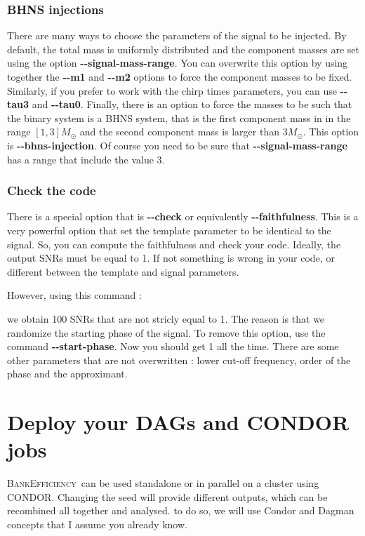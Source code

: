 \documentclass[a4paper,10pt]{article}
\newcommand{\code}[1]{%
\begin{center}
  \fboxsep=10pt
  \fcolorbox{black}{yellow}
  { \parbox[c]{12cm}{ \color{blue}{#1}}}
\end{center}}
\newcommand{\be}{\textsc{BankEfficiency}~}
\begin{document}
 

\subsubsection{BHNS injections}
There are many ways to choose the parameters of the signal to be injected. By default, the total mass is uniformly distributed and the component masses are set using the option \textbf{{-}{-}signal-mass-range}. You can overwrite this option by using together the \textbf{{-}{-}m1} and \textbf{{-}{-}m2} options to force the component masses to be fixed. Similarly, if you prefer to work with the chirp times parameters, you can use 
\textbf{{-}{-}tau3} and \textbf{{-}{-}tau0}. Finally, there is an option to force the masses to be such that the binary system is a BHNS system, that is the first component mass in in the range $[1,3]M_\odot$ and the second component mass is larger than $3M_\odot$. This option is \textbf{{-}{-}bhns-injection}. Of course you need to be sure that \textbf{{-}{-}signal-mass-range} has a range that include the value 3.

\subsubsection{Check the code}
There is a special option that is \textbf{{-}{-}check} or equivalently \textbf{{}-{-}faithfulness}. This is a very powerful option that set the template parameter to be identical to the signal. So, you can compute the faithfulness and check your code. Ideally, the output SNRs must be equal to 1. If not something is wrong in your code, or different between the template and signal parameters. 

However, using this command :
\code{./lalapps\_BankEfficiency --template EOB --signal EOB --xml-output --n 100 --check} 
we obtain 100 SNRs that are not stricly equal to 1. The reason is that we randomize the starting phase of the signal. To remove this option, use the command \textbf{{-}{-}start-phase}. Now you should get 1 all the time. There are some other parameters that are not overwritten : lower cut-off frequency, order of the phase and the approximant.


\section{Deploy your DAGs and CONDOR jobs}\label{dagandini}
\be can be used standalone or in parallel on a cluster using \textsc{CONDOR}. Changing the seed will provide different outputs, which can be recombined all together and analysed. to do so, we will use Condor and Dagman concepts that I assume you already know.
\end{document}
